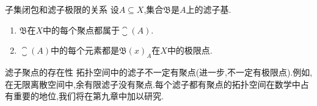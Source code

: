 \begin{proposition}{子集闭包和滤子极限的关系}{}
	设$A\subseteq X$,集合$\mathfrak{B}$是$A$上的滤子基.
	\begin{enumerate}
		\item $\mathfrak{B}$在$X$中的每个聚点都属于$\closure\left(A\right)$.
		\item $\closure\left(A\right)$中的每个元素都是$\mathfrak{B}\left(x\right)_{A}$在$X$中的极限点.
	\end{enumerate}
\end{proposition}

\begin{remark}{滤子聚点的存在性}{}
	拓扑空间中的滤子不一定有聚点(进一步,不一定有极限点).例如,在无限离散空间中,余有限滤子没有聚点.每个滤子都有聚点的拓扑空间在数学中占有重要的地位,我们将在第九章中加以研究.
\end{remark}






